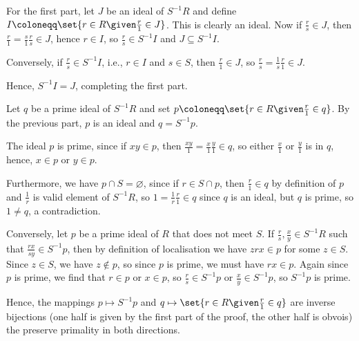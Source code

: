 For the first part, let $J$ be an ideal of $S^{-1}R$ and define
$I\coloneqq \set{r \in R\given \frac{r}{1} \in J}$. This is clearly an ideal.
Now if $\frac{r}{s} \in J$, then $\frac{r}{1} = \frac{s}{1}\frac{r}{s} \in J$,
hence $r \in I$, so $\frac{r}{s} \in S^{-1}I$ and $J \subseteq S^{-1}I$.

Conversely, if $\frac{r}{s} \in S^{-1}I$, i.e., $r \in I$ and $s \in S$, then
$\frac{r}{1} \in J$, so $\frac{r}{s} = \frac{1}{s}\frac{r}{1} \in J$.

Hence, $S^{-1}I = J$, completing the first part.

Let $q$ be a prime ideal of $S^{-1}R$ and set $p\coloneqq\set{r \in R\given \frac{r}{1} \in q}$.
By the previous part, $p$ is an ideal and $q = S^{-1}p$.

The ideal $p$ is prime, since if $xy \in p$, then $\frac{xy}{1} = \frac{x}{1}\frac{y}{1} \in q$, so either
$\frac{x}{1}$ or $\frac{y}{1}$ is in $q$, hence, $x \in p$ or $y \in p$.

Furthermore, we have $p \cap S = \varnothing$, since if $r \in S\cap p$, then
$\frac{r}{1} \in q$ by definition of $p$ and $\frac{1}{r}$ is valid element of
$S^{-1}R$, so $1 = \frac{1}{r}\frac{r}{1} \in q$ since $q$ is an ideal, but
$q$ is prime, so $1 \neq q$, a contradiction.

Conversely, let $p$ be a prime ideal of $R$ that does not meet $S$. If
$\frac{r}{s}, \frac{x}{y} \in S^{-1}R$ such that $\frac{rx}{sy} \in S^{-1}p$,
then by definition of localisation we have $zrx \in p$ for some $z \in S$.
Since $z \in S$, we have $z\notin p$, so since $p$ is prime, we must have
$rx \in p$. Again since $p$ is prime, we find that $r \in p$ or $x \in p$, so
$\frac{r}{s} \in S^{-1}p$ or $\frac{x}{y} \in S^{-1}p$, so $S^{-1}p$ is prime.

Hence, the mappings $p \mapsto S^{-1}p$ and $q\mapsto\set{r \in R\given \frac{r}{1} \in q}$
are inverse bijections (one half is given by the first part of the proof,
the other half is obvois) the preserve primality in both directions.
